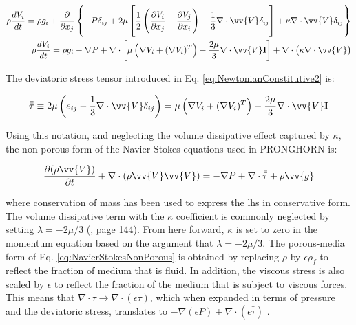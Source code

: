 \documentclass[10pt]{article}
\numberwithin{equation}{section} %
\begin{document}
\begin{equation}
\label{eq:NSFullForm}
\begin{aligned}
\rho\frac{dV_i}{dt}=\rho g_i+\frac{\partial}{\partial x_j}\left\{-P\delta_{ij}+2\mu\left\lbrack\frac{1}{2}\left(\frac{\partial V_i}{\partial x_j}+\frac{\partial V_j}{\partial x_i}\right)-\frac{1}{3}\nabla\cdot\vv{V}\delta_{ij}\right\rbrack+\kappa\nabla\cdot\vv{V}\delta_{ij}\right\}\\
\rho\frac{dV_i}{dt}=\rho g_i-\nabla P+\nabla\cdot\left\lbrack\mu\left(\nabla V_i+(\nabla V_i)^T\right)-\frac{2\mu}{3}\nabla\cdot\vv{V}\textbf{I}\right\rbrack+\nabla\cdot\left(\kappa\nabla\cdot\vv{V}\right)\\
\end{aligned}
\end{equation}

The deviatoric stress tensor introduced in Eq. \eqref{eq:NewtonianConstitutive2} is:

\begin{equation}
\label{eq:DeviatoricStressTensor}
\bar{\bar{\tau}}\equiv2\mu\left(e_{ij}-\frac{1}{3}\nabla\cdot\vv{V}\delta_{ij}\right)=\mu\left(\nabla V_i+(\nabla V_i)^T\right)-\frac{2\mu}{3}\nabla\cdot\vv{V}\textbf{I}
\end{equation}

Using this notation, and neglecting the volume dissipative effect captured by \(\kappa\), the non-porous form of the Navier-Stokes equations used in PRONGHORN is:

\begin{equation}
\label{eq:NavierStokesNonPorous}
\frac{\partial(\rho\vv{V})}{\partial t}+\nabla\cdot(\rho\vv{V}\vv{V})=-\nabla P+\nabla\cdot\bar{\bar\tau}+\rho\vv{g}
\end{equation}

where conservation of mass has been used to express the \gls{lhs} in conservative form. The volume dissipative term with the \(\kappa\) coefficient is commonly neglected by setting \(\lambda=-2\mu/3\) (\cite{batchelor}, page 144). From here forward, \(\kappa\) is set to zero in the momentum equation based on the argument that \(\lambda=-2\mu/3\). The porous-media form of Eq. \eqref{eq:NavierStokesNonPorous} is obtained by replacing \(\rho\) by \(\epsilon\rho_f\) to reflect the fraction of medium that is fluid. In addition, the viscous stress is also scaled by \(\epsilon\) to reflect the fraction of the medium that is subject to viscous forces. This means that \(\nabla\cdot\tau\rightarrow\nabla\cdot(\epsilon\tau)\), which when expanded in terms of pressure and the deviatoric stress, translates to \(-\nabla(\epsilon P)+\nabla\cdot(\epsilon\bar{\bar{\tau}})\) \cite{thermalpedia}. 
\end{document}
